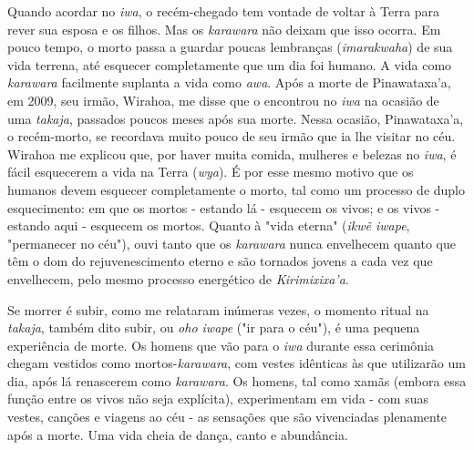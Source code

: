 Quando acordar no \emph{iwa}, o recém-chegado tem vontade de voltar à
Terra para rever sua esposa e os filhos. Mas os \emph{karawara} não
deixam que isso ocorra. Em pouco tempo, o morto passa a guardar poucas
lembranças (\emph{imarakwaha}) de sua vida terrena, até esquecer
completamente que um dia foi humano. A vida como \emph{karawara}
facilmente suplanta a vida como \emph{awa}. Após a morte de
Pinawataxa'a, em 2009, seu irmão, Wirahoa, me disse que o encontrou no
\emph{iwa} na ocasião de uma \emph{takaja}, passados poucos meses após
sua morte. Nessa ocasião, Pinawataxa'a, o recém-morto, se recordava
muito pouco de seu irmão que ia lhe visitar no céu. Wirahoa me explicou
que, por haver muita comida, mulheres e belezas no \emph{iwa}, é fácil
esquecerem a vida na Terra (\emph{wya}). É por esse mesmo motivo que os
humanos devem esquecer completamente o morto, tal como um processo de
duplo esquecimento: em que os mortos - estando lá - esquecem os vivos; e
os vivos - estando aqui - esquecem os mortos. Quanto à "vida eterna"
(\emph{ikwẽ iwape}, "permanecer no céu"), ouvi tanto que os
\emph{karawara} nunca envelhecem quanto que têm o dom do
rejuvenescimento eterno e são tornados jovens a cada vez que envelhecem,
pelo mesmo processo energético de \emph{Kirimixixa'a}.

Se morrer é subir, como me relataram inúmeras vezes, o momento ritual na
\emph{takaja}, também dito subir, ou \emph{oho iwape} ("ir para o céu"),
é uma pequena experiência de morte. Os homens que vão para o \emph{iwa}
durante essa cerimônia chegam vestidos como mortos-\emph{karawara}, com
vestes idênticas às que utilizarão um dia, após lá renascerem como
\emph{karawara}. Os homens, tal como xamãs (embora essa função entre os
vivos não seja explícita), experimentam em vida - com suas vestes,
canções e viagens ao céu - as sensações que são vivenciadas plenamente
após a morte. Uma vida cheia de dança, canto e abundância.

